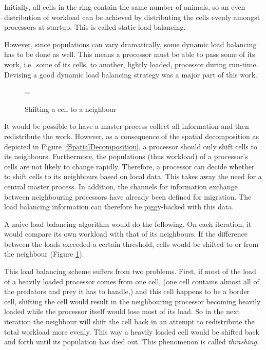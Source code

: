 Initially, all cells in the ring contain the same number of animals,
so an even distribution of workload can be achieved by distributing
the cells evenly amongst processors at startup. This is called static
load balancing.

However, since populations can vary dramatically, some dynamic load
balancing has to be done as well. This means a processor must be able to
pass some of its work, i.e.\ some of its cells, to another, lightly
loaded, processor during run-time. Devising a good dynamic load balancing
strategy was a major part of this work.

\begin{figure}
\epsfxsize=\textwidth
{}
\caption{Shifting a cell to a neighbour}
\label{fShifting}
\end{figure}


It would be possible to have a master process collect all information and
then redistribute the work. However, as a consequence of the spatial
decomposition as depicted in Figure \ref{fSpatialDecomposition}, a
processor should only shift cells to its neighbours. Furthermore, the
populations (thus workload) of a processor's cells are not likely to
change rapidly. Therefore, a
processor can decide whether to shift cells to its neighbours based on
local data. This takes away the need for a central master process. In
addition, the channels for information exchange between neighbouring
processors have already been defined for migration. The load balancing
information can therefore be piggy-backed with this data.

A naive load balancing algorithm would do the following. On each
iteration, it would compare its own workload with that of its
neighbours. If the difference between the loads exceeded a certain
threshold, cells would be shifted to or from the neighbour (Figure
\ref{fShifting}).

This load balancing scheme suffers from two
problems. First, if most of the load of a heavily loaded 
processor comes from
one cell, (one cell contains almost all of the predators
and prey it has to handle,) and this cell happens to be a border cell,
shifting the cell would result in the neighbouring processor becoming
heavily loaded while the processor itself would lose most of its load. So
in the next iteration the neighbour will shift the cell back in an
attempt to redistribute the total workload more evenly. This way a
heavily loaded cell would be shifted back and forth until its population
has died out. This phenomenon is called {\em thrashing}.


